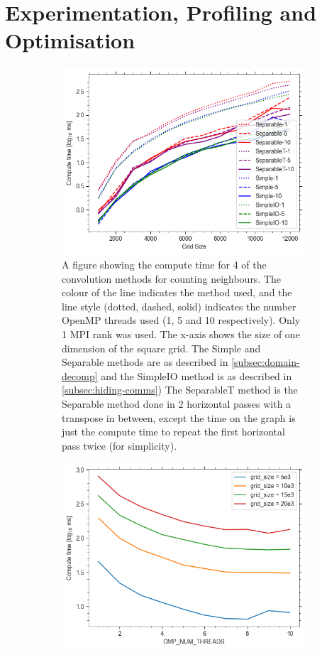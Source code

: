 
\section{Experimentation, Profiling and Optimisation}\label{sec:profiling}
\begin{figure}[t]
\centering
\begin{subfigure}{0.9\textwidth}
  \centering
  \includegraphics[width=.8\linewidth]{./figures/convolutions}
  \caption{A figure showing the compute time for 4 of the convolution methods for counting neighbours.
        The colour of the line indicates the method used, and the line style (dotted, dashed, solid) indicates the number
        OpenMP threads used (1, 5 and 10 respectively).
        Only 1 MPI rank was used.
        The x-axis shows the size of one dimension of the square grid.
        The Simple and Separable methods are as described in \eqref{subsec:domain-decomp} and the SimpleIO method is
        as described in \eqref{subsec:hiding-comms})
        The SeparableT method is the Separable method done in 2 horizontal passes with a transpose in between, except
        the time on the graph is just the compute time to repeat the first horizontal pass twice (for simplicity).}
  \label{fig:convolutions}
\end{subfigure}%
\hfill
\begin{subfigure}{0.9\textwidth}
  \centering
  \includegraphics[width=0.8\linewidth]{./figures/simpleio}

\end{subfigure}
\end{figure}
